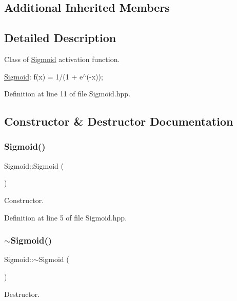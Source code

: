 \subsection*{Additional Inherited Members}


\subsection{Detailed Description}
Class of \hyperlink{class_sigmoid}{Sigmoid} activation function. 

\hyperlink{class_sigmoid}{Sigmoid}\+: f(x) = 1/(1 + e$^\wedge$(-\/x)); 

Definition at line 11 of file Sigmoid.\+hpp.



\subsection{Constructor \& Destructor Documentation}
\mbox{\label{class_sigmoid_af871f2160541f3aa75558900cae467ba}} 
\subsubsection{\texorpdfstring{Sigmoid()}{Sigmoid()}}
{\footnotesize\ttfamily Sigmoid\+::\+Sigmoid (\begin{DoxyParamCaption}{ }\end{DoxyParamCaption})}



Constructor. 



Definition at line 5 of file Sigmoid.\+hpp.

\mbox{\label{class_sigmoid_a88d0c24dd37b6a90ee7607b5329ab60b}} 
\subsubsection{\texorpdfstring{$\sim$\+Sigmoid()}{~Sigmoid()}}
{\footnotesize\ttfamily Sigmoid\+::$\sim$\+Sigmoid (\begin{DoxyParamCaption}{ }\end{DoxyParamCaption})}



Destructor. 



